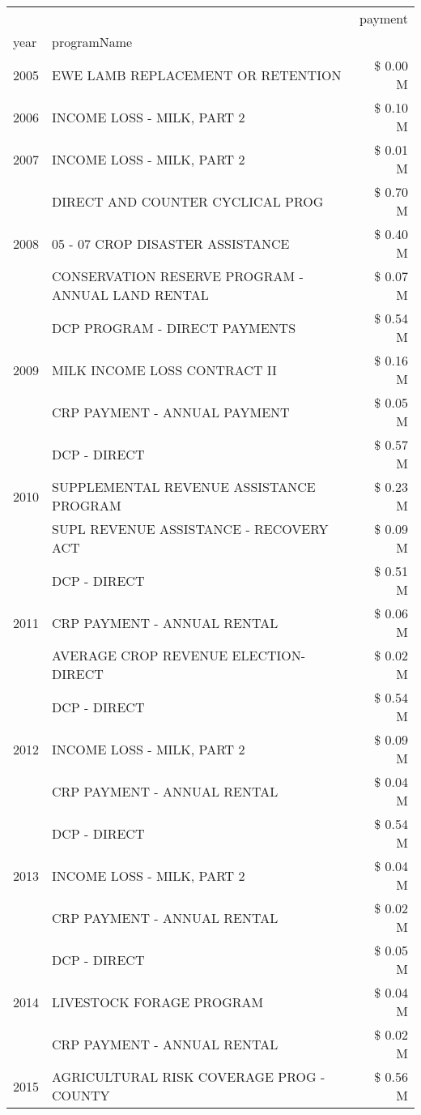 \begin{tabular}{llr}
\toprule
 &  & payment \\
year & programName &  \\
\midrule
2005 & EWE LAMB REPLACEMENT OR RETENTION & \$ 0.00 M \\
\cline{1-3}
2006 & INCOME LOSS - MILK, PART 2 & \$ 0.10 M \\
\cline{1-3}
2007 & INCOME LOSS - MILK, PART 2 & \$ 0.01 M \\
\cline{1-3}
\multirow[t]{3}{*}{2008} & DIRECT AND COUNTER CYCLICAL PROG & \$ 0.70 M \\
 & 05 - 07 CROP DISASTER ASSISTANCE & \$ 0.40 M \\
 & CONSERVATION RESERVE PROGRAM - ANNUAL LAND RENTAL & \$ 0.07 M \\
\cline{1-3}
\multirow[t]{3}{*}{2009} & DCP PROGRAM - DIRECT PAYMENTS & \$ 0.54 M \\
 & MILK INCOME LOSS CONTRACT II & \$ 0.16 M \\
 & CRP PAYMENT - ANNUAL PAYMENT & \$ 0.05 M \\
\cline{1-3}
\multirow[t]{3}{*}{2010} & DCP - DIRECT & \$ 0.57 M \\
 & SUPPLEMENTAL REVENUE ASSISTANCE PROGRAM & \$ 0.23 M \\
 & SUPL REVENUE ASSISTANCE - RECOVERY ACT & \$ 0.09 M \\
\cline{1-3}
\multirow[t]{3}{*}{2011} & DCP - DIRECT & \$ 0.51 M \\
 & CRP PAYMENT - ANNUAL RENTAL & \$ 0.06 M \\
 & AVERAGE CROP REVENUE ELECTION-DIRECT & \$ 0.02 M \\
\cline{1-3}
\multirow[t]{3}{*}{2012} & DCP - DIRECT & \$ 0.54 M \\
 & INCOME LOSS - MILK, PART 2 & \$ 0.09 M \\
 & CRP PAYMENT - ANNUAL RENTAL & \$ 0.04 M \\
\cline{1-3}
\multirow[t]{3}{*}{2013} & DCP - DIRECT & \$ 0.54 M \\
 & INCOME LOSS - MILK, PART 2 & \$ 0.04 M \\
 & CRP PAYMENT - ANNUAL RENTAL & \$ 0.02 M \\
\cline{1-3}
\multirow[t]{3}{*}{2014} & DCP - DIRECT & \$ 0.05 M \\
 & LIVESTOCK FORAGE PROGRAM & \$ 0.04 M \\
 & CRP PAYMENT - ANNUAL RENTAL & \$ 0.02 M \\
\cline{1-3}
\multirow[t]{3}{*}{2015} & AGRICULTURAL RISK COVERAGE PROG - COUNTY & \$ 0.56 M \\

\end{tabular}
